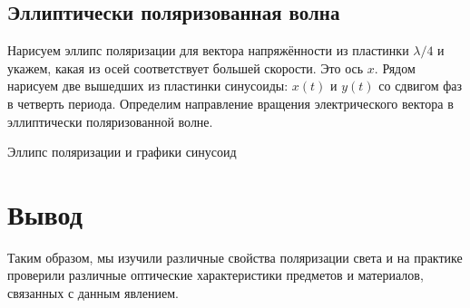 \documentclass[a4paper,12pt]{article}
\begin{document}
\subsection{Эллиптически поляризованная волна}

Нарисуем эллипс поляризации для вектора напряжённости из пластинки $ \lambda/4 $ и укажем, какая из осей соответствует большей скорости. Это ось $ x $. Рядом нарисуем две вышедших из пластинки синусоиды: $ x(t) $ и $ y(t) $ со сдвигом фаз в четверть периода. Определим направление вращения электрического вектора в эллиптически поляризованной волне.

\begin{minipage}{0.47\textwidth}
\begin{center}
\end{center}
\end{minipage}
\begin{minipage}{0.47\textwidth}
\begin{center}
\end{center}
\end{minipage}

\begin{center}
Эллипс поляризации и графики синусоид
\end{center}

\section{Вывод}

Таким образом, мы изучили различные свойства поляризации света и на практике проверили различные оптические характеристики предметов и материалов, связанных с данным явлением. 
\end{document}
